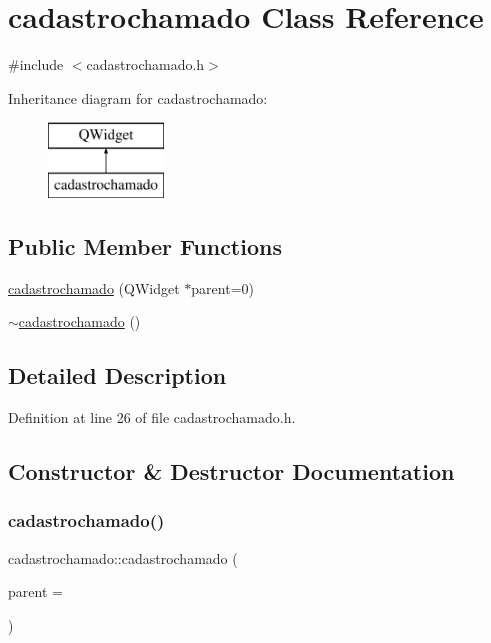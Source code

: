\hypertarget{classcadastrochamado}{}\section{cadastrochamado Class Reference}
\label{classcadastrochamado}


{\ttfamily \#include $<$cadastrochamado.\+h$>$}

Inheritance diagram for cadastrochamado\+:\begin{figure}[H]
\begin{center}
\leavevmode
\includegraphics[height=2.000000cm]{classcadastrochamado}
\end{center}
\end{figure}
\subsection*{Public Member Functions}
\begin{DoxyCompactItemize}
\item 
\hyperlink{classcadastrochamado_a626bec1c5a76c3fe062f70f3fe857c3f}{cadastrochamado} (Q\+Widget $\ast$parent=0)
\item 
\hyperlink{classcadastrochamado_aafb8985f35d1e6d47dbc8be3a4cf0de9}{$\sim$cadastrochamado} ()
\end{DoxyCompactItemize}


\subsection{Detailed Description}


Definition at line 26 of file cadastrochamado.\+h.



\subsection{Constructor \& Destructor Documentation}
\hypertarget{classcadastrochamado_a626bec1c5a76c3fe062f70f3fe857c3f}{}\label{classcadastrochamado_a626bec1c5a76c3fe062f70f3fe857c3f} 
\subsubsection{\texorpdfstring{cadastrochamado()}{cadastrochamado()}}
{\footnotesize\ttfamily cadastrochamado\+::cadastrochamado (\begin{DoxyParamCaption}\item[{Q\+Widget $\ast$}]{parent = {} }\end{DoxyParamCaption})\hspace{0.3cm}{\ttfamily [explicit]}}



